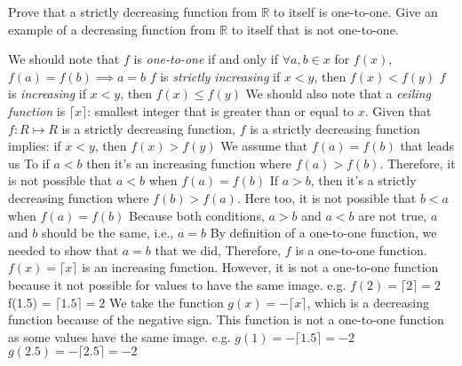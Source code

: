 \documentclass[addpoints]{exam}
\begin{document}
\begin{questions}
\question[5] Prove that a strictly decreasing function from $\mathbb{R}$ to itself is one-to-one. Give an example of a decreasing function from $\mathbb{R}$ to itself that is not one-to-one.
  \begin{solution}
    We should note that $f$ is \textit{one-to-one} if and only if $\forall a, b \in x$ for $f(x)$, $f(a) = f(b) \implies a=b $ 
    \newline $f$ is \textit{strictly increasing} if $x < y$, then $f(x) < f(y)$
    \newline $f$ is \textit{increasing} if $x < y$, then $f(x) \leq f(y)$
    \newline We should also note that a \textit{ceiling function} is $\lceil x \rceil$: smallest integer that is greater than or equal to $x$.
    \newline
    \newline Given that $f: R \mapsto R$ is a strictly decreasing function,
    \newline $f$ is a strictly decreasing function implies: if $x < y$, then $f(x) > f(y)$
    \newline We assume that $f(a) = f(b)$ that leads us To
    \newline if $a < b$ then it's an increasing function where $f(a) > f(b)$.
    \newline Therefore, it is not possible that $a < b$ when $f(a) = f(b)$
    \newline 
    \newline If $a > b$, then it's a strictly decreasing function where $f(b) > f(a).$
    \newline Here too, it is not possible that $b<a$ when $f(a) = f(b)$
    \newline
    \newline Because both conditions, $a>b$ and $a<b$ are not true, 
    \newline $a$ and $b$ should be the same, i.e., $a=b$
    \newline By definition of a one-to-one function, we needed to show that $a=b$ that we did,
    \newline Therefore, $f$ is a one-to-one function.
    \newline
    \newline $f(x) = \lceil x \rceil$ is an increasing function.
    \newline However, it is not a one-to-one function because it not possible for values to have the same image.
    \newline e.g. $f(2) = \lceil 2 \rceil = 2$
    \newline f(1.5) = $\lceil 1.5 \rceil = 2$
    \newline 
    \newline We take the function $g(x) = - \lceil x \rceil$, which is a decreasing function because of the negative sign.
    \newline This function is not a one-to-one function as some values have the same image.
    \newline e.g. $g(1) = - \lceil 1.5 \rceil = -2 $
    \newline $g(2.5) = - \lceil 2.5 \rceil = -2$


\end{solution}
\end{questions}
\end{document}
